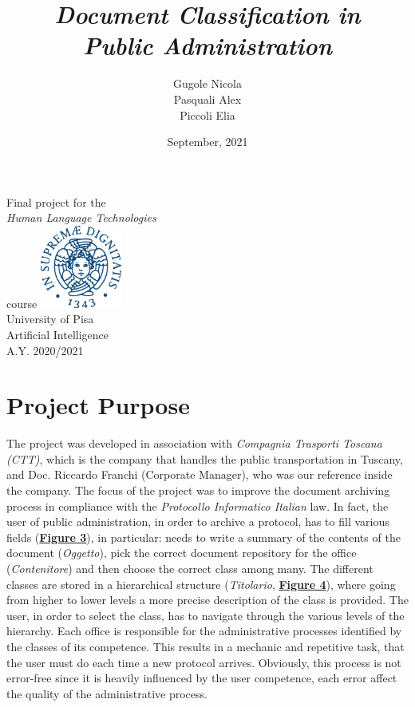 \documentclass[12pt]{article}
\title{\textit{Document Classification in \\Public Administration}}
\author{Gugole Nicola\\Pasquali Alex\\Piccoli Elia}
\date{September, 2021}
\begin{document}
\begin{titlepage}
	\maketitle
   \begin{center}
	\vspace{0.5cm}
       Final project for the\\ \textit{Human Language Technologies}\\ course
       \vfill	     
       \includegraphics[width=0.2\textwidth]{unipi.png}\\
       University of Pisa\\
       Artificial Intelligence\\
       A.Y. 2020/2021\\
   \end{center}
\end{titlepage}
\newpage
{\footnotesize \tableofcontents}
\newpage

\section{Project Purpose}\label{sec:projectpurpose}
The project was developed in association with \textit{Compagnia Trasporti Toscana (CTT)}, which is the company that handles the public transportation in Tuscany, and Doc. Riccardo Franchi (Corporate Manager), who was our reference inside the company.
The focus of the project was to improve the document archiving process in compliance with the \textit{Protocollo Informatico Italian} law. In fact, the user of public administration, in order to archive a protocol, has to fill various fields (\hyperref[fig:interface]{\textbf{Figure 3}}), in particular: needs to write a summary of the contents of the document (\textit{Oggetto}), pick the correct document repository for the office (\textit{Contenitore}) and then choose the correct class among many. The different classes are stored in a hierarchical structure (\textit{Titolario}, \hyperref[fig:classinterface]{\textbf{Figure 4}}), where going from higher to lower levels a more precise description of the class is provided. The user, in order to select the class, has to navigate through the various levels of the hierarchy. Each office is responsible for the administrative processes identified by the classes of its competence. This results in a mechanic and repetitive task, that the user must do each time a new protocol arrives. Obviously, this process is not error-free since it is heavily influenced by the user competence, each error affect the quality of the administrative process.\\
\end{document}
